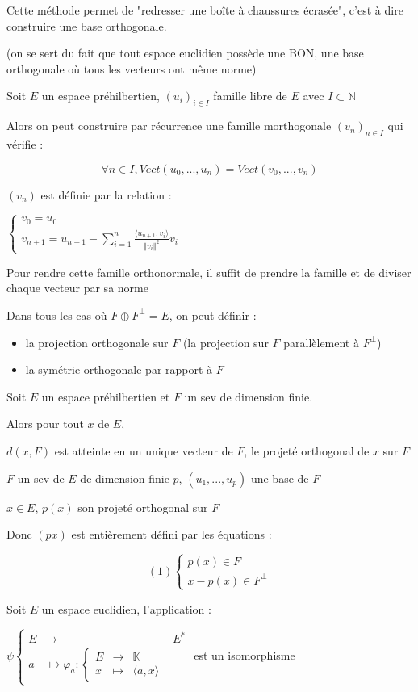 \documentclass[a4paper,12pt]{book}
\newcommand{\Def}[2]{\begin{tcolorbox}[colback=white,colframe=red!10!green!20!blue!75!, title=Définition : #1]#2\end{tcolorbox}}
\newcommand{\Thr}[2]{\begin{tcolorbox}[sharp corners, colback=white,colframe=red!10!blue!30!green!75!, title=Théorème : #1]#2\end{tcolorbox}}
\def\N{\mathbb{N}}
\def\K{\mathbb{K}}
\begin{document}
\Thr{Méthode de Schmidt}{Cette méthode permet de "redresser une boîte à chaussures écrasée", c'est à dire construire une base orthogonale.
\par (on se sert du fait que tout espace euclidien possède une BON, une base orthogonale où tous les vecteurs ont même norme)
\par Soit $E$ un espace préhilbertien, $(u_i)_{i\in I}$ famille libre de $E$ avec $I\subset \N$
\par Alors on peut construire par récurrence une famille morthogonale $(v_n)_{n\in I}$ qui vérifie :
\par $$\forall n\in I, Vect(u_0,..., u_n) =Vect(v_0,..., v_n)$$
\par $(v_n)$ est définie par la relation :
\par $\begin{cases} v_0 = u_0 \\ v_{n+1} = u_{n+1} - \sum\limits_{i=1}^n\frac{\langle u_{n+1}, v_i\rangle}{\Vert v_i\Vert^2}v_i \end{cases}$
\par Pour rendre cette famille orthonormale, il suffit de prendre la famille et de diviser chaque vecteur par sa norme}
\Def{}{Dans tous les cas où $F\oplus F^\perp = E$, on peut définir :\begin{itemize}
\item la projection orthogonale sur $F$ (la projection sur $F$ parallèlement à $F^\perp$)
\item la symétrie orthogonale par rapport à $F$
\end{itemize}}
\Thr{de la meilleure approximation}{Soit $E$ un espace préhilbertien et $F$ un sev de dimension finie.
\par Alors pour tout $x$ de $E$,
\par \begin{center} $d(x,F)$ est atteinte en un unique vecteur de $F$, le projeté orthogonal de $x$ sur $F$\end{center}}
\Thr{Calcul pratique du projeté}{$F$ un sev de $E$ de dimension finie $p$, $(u_1, ..., u_p)$ une base de $F$
\par $x\in E$, $p(x)$ son projeté orthogonal sur $F$
\par Donc $(px)$ est entièrement défini par les équations :
\par $$(1)\left\{\begin{array}{l} p(x)\in F \\ x-p(x)\in F^\perp\end{array}\right.$$}
\Thr{de représentation de Reese (cas euclidien)}{Soit $E$ un espace euclidien, l'application :
\par $\psi\left\{\begin{array}{rcl} E & \to & E^* \\a & \mapsto \varphi_a:\left\{\begin{array}{rcl} E & \to & \K\\ x & \mapsto & \langle a, x\rangle\end{array}\right.\end{array}\right.$ est un isomorphisme}
\end{document}
